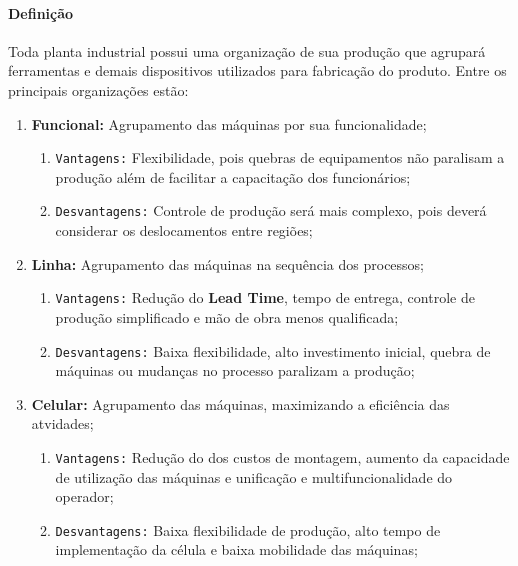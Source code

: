 \documentclass{article}
\begin{document}
            \paragraph{Definição}Toda planta industrial possui uma organização de sua produção que agrupará ferramentas e demais dispositivos utilizados para fabricação do produto. Entre os principais organizações estão:
                \begin{enumerate}[rightmargin = \leftmargin]
                    \item \textbf{Funcional:} Agrupamento das máquinas por sua funcionalidade;
                        \begin{enumerate}[rightmargin = \leftmargin, noitemsep]
                            \item \texttt{Vantagens:} Flexibilidade, pois quebras de equipamentos não paralisam a produção além de facilitar a capacitação dos funcionários;
                            \item \texttt{Desvantagens:} Controle de produção será mais complexo, pois deverá considerar os deslocamentos entre regiões;
                        \end{enumerate}

                    \item \textbf{Linha:} Agrupamento das máquinas na sequência dos processos;
                        \begin{enumerate}[rightmargin = \leftmargin, noitemsep]
                            \item \texttt{Vantagens:} Redução do \textbf{Lead Time}, tempo de entrega, controle de produção simplificado e mão de obra menos qualificada;
                            \item \texttt{Desvantagens:} Baixa flexibilidade, alto investimento inicial, quebra de máquinas ou mudanças no processo paralizam a produção;
                        \end{enumerate}

                    \item \textbf{Celular:} Agrupamento das máquinas, maximizando a eficiência das atvidades;
                        \begin{enumerate}[rightmargin = \leftmargin, noitemsep]
                            \item \texttt{Vantagens:} Redução do dos custos de montagem, aumento da capacidade de utilização das máquinas e unificação e multifuncionalidade do operador;
                            \item \texttt{Desvantagens:} Baixa flexibilidade de produção, alto tempo de implementação da célula e baixa mobilidade das máquinas;
                        \end{enumerate}
                \end{enumerate}
\newpage
\end{document}
